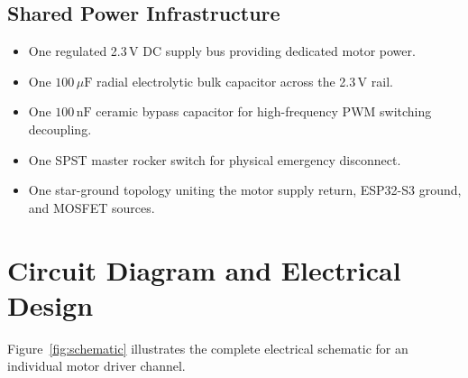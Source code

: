\documentclass[10pt,twocolumn]{article}
\begin{document}
\subsection{Shared Power Infrastructure}
\begin{itemize}
    \item One regulated 2.3\,V DC supply bus providing dedicated motor power.
    \item One $100\,\mu\text{F}$ radial electrolytic bulk capacitor across the 2.3\,V rail.
    \item One $100\,\text{nF}$ ceramic bypass capacitor for high-frequency PWM switching decoupling.
    \item One SPST master rocker switch for physical emergency disconnect.
    \item One star-ground topology uniting the motor supply return, ESP32-S3 ground, and MOSFET sources.
\end{itemize}

\section{Circuit Diagram and Electrical Design}
Figure~\ref{fig:schematic} illustrates the complete electrical schematic for an individual motor driver channel. 
\end{document}
